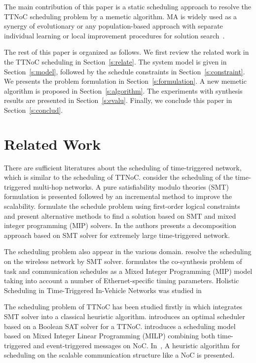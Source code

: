 \documentclass[journal]{IEEEtran}
\theoremstyle{remark}
\begin{document}
The main contribution of this paper is a static scheduling approach to resolve the TTNoC scheduling problem by a memetic algorithm. 
MA is widely used as a synergy of evolutionary or any population-based approach with separate individual learning or local improvement procedures for solution search~\cite{DBLP:journals/tec/ChenOLT11}. 

The rest of this paper is organized as follows. 
We first review the related work in the TTNoC scheduling in Section~\ref{s:relate}. 
The system model is given in Section~\ref{s:model},
 followed by the schedule constraints in Section~\ref{s:constraint}.
We presents the problem formulation in Section~\ref{s:formulation}.
A new memetic algorithm is proposed in Section~\ref{s:algorithm}.
The experiments with synthesis results are presented in Section~\ref{s:evalu}.
Finally, we conclude this paper in Section~\ref{s:conclud}.

\section{Related Work	\label{s:relate}}

There are sufficient literatures about the scheduling of time-triggered network,
 which is similar to the scheduling of TTNoC. 
\cite{DBLP:conf/rtss/Steiner10} consider the scheduling of the time-triggered multi-hop networks.
A pure satisfiability modulo theories (SMT) formulation is presented followed by an incremental method to improve the scalability.
\cite{DBLP:journals/rts/CraciunasO16,DBLP:conf/rtns/CraciunasO14} formulate the schedule problem using first-order logical constraints and present alternative methods to find a solution based on SMT and mixed integer programming (MIP) solvers.
In \cite{DBLP:conf/etfa/PozoSRH15} the authors presents a decomposition approach based on SMT solver for extremely large time-triggered network.

The scheduling problem also appear in the various domain.
\cite{DBLP:conf/isorc/RoRM15} resolve the scheduling on the wireless network by SMT solver.
\cite{DBLP:conf/aspdac/ZhangG0C14} formulates the co-synthesis problem of task and communication schedules as a Mixed Integer Programming (MIP) model taking into account a number of Ethernet-specific timing parameters.
Holistic Scheduling in Time-Triggered In-Vehicle Networks was studied in~\cite{DBLP:journals/tii/HuLWLZ14}

The scheduling problem of TTNoC has been
studied firstly in \cite{DBLP:conf/date/HuangBRBK12} which integrates SMT solver into a classical heuristic algorithm. 
\cite{DBLP:conf/sies/ScholerKMO15} introduces an optimal scheduler based on a Boolean SAT solver for a TTNoC.
\cite{DBLP:conf/indin/MurshedOAK15} introduces a scheduling model based on Mixed Integer Linear Programming (MILP) combining both time-triggered and event-triggered messages on NoC.
In~\cite{DBLP:conf/sies/FreierC15},
 A heuristic algorithm for scheduling on the scalable communication structure like a NoC is presented. 
\end{document}

